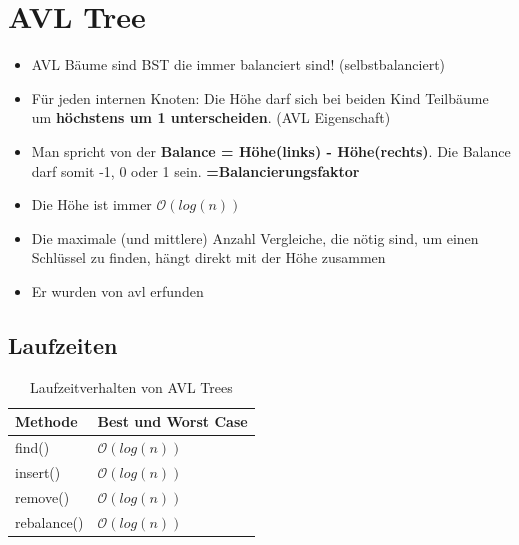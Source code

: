 \section{AVL Tree}
\begin{itemize}
	\item AVL Bäume sind BST die immer balanciert sind! (selbstbalanciert)
	\item Für jeden internen Knoten: Die Höhe darf sich bei beiden Kind Teilbäume um \textbf{höchstens um 1 unterscheiden}. (AVL Eigenschaft)
	\item Man spricht von der \textbf{Balance = Höhe(links) - Höhe(rechts)}. Die Balance darf somit -1, 0 oder 1 sein. \textbf{=Balancierungsfaktor}
	\item Die Höhe ist immer $\mathcal{O}(log(n))$
	\item Die maximale (und mittlere) Anzahl Vergleiche, die nötig sind, um einen Schlüssel zu finden, hängt direkt mit der Höhe zusammen
	\item Er wurden von \gls{avl} erfunden
\end{itemize}

\subsection{Laufzeiten}
\begin{table}[h]
	\centering
	\begin{tabu} to \linewidth {l l}
		\toprule
		Methode & Best und Worst Case \\
		\midrule
		find() & $\mathcal{O}(log(n))$   \\
		insert() & $\mathcal{O}(log(n))$ \\
		remove() & $\mathcal{O}(log(n))$ \\
		rebalance() & $\mathcal{O}(log(n))$   \\
		\bottomrule
	\end{tabu}
	\caption{Laufzeitverhalten von AVL Trees}
\end{table}

